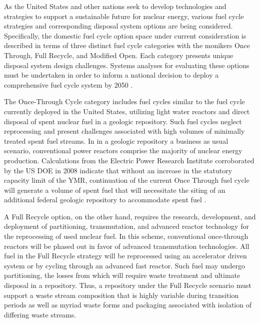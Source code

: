 

As the United States and other nations seek to develop technologies and strategies to support a 
sustainable future for nuclear energy, various fuel cycle strategies and 
corresponding disposal system options are being considered.  Specifically, the 
domestic fuel cycle option space under current consideration is described in 
terms of three distinct fuel cycle categories with the monikers Once Through, 
Full Recycle, and Modified Open. Each category presents unique disposal system 
design challenges. Systems analyses for evaluating these options must 
be undertaken in order to inform a national decision to deploy a comprehensive 
fuel cycle system by 2050 \cite{doe_nuclear_2010}. 


The Once-Through Cycle category includes fuel cycles similar to the fuel cycle 
currently deployed in the United States, utilizing light water reactors and 
direct disposal of spent nuclear fuel in a geologic repository.
Such fuel cycles neglect reprocessing and present challenges associated with 
high volumes of minimally treated spent fuel streams.  In in a geologic 
repository a business as usual 
scenario, conventional power reactors comprise the majority of nuclear energy 
production. 
Calculations from the Electric Power Research Institute corroborated by 
the \gls{US} \gls{DOE} in 2008 indicate that without an increase in the statutory 
capacity limit of the \gls{YMR}, continuation of the current Once Through fuel 
cycle will generate a volume of spent fuel that will necessitate
the siting of an additional federal geologic repository to accommodate spent 
fuel \cite{kessler_room_2006, doe_report_2008}. 


A Full Recycle option, on the other hand, requires the research, development, 
and deployment of partitioning, transmutation, and advanced reactor technology 
for the reprocessing of used nuclear fuel.  In this scheme, conventional 
once-through reactors will be phased out in favor of advanced transmutation 
technologies. All fuel in the Full Recycle strategy will be 
reprocessed using an accelerator driven system or by 
cycling through an advanced fast reactor. Such fuel may undergo partitioning, 
the losses from which will require waste treatment and ultimate disposal in a 
repository. Thus, a repository under the Full Recycle scenario must support
a waste stream composition that is highly variable during transition periods as 
well as myriad waste forms and packaging associated with isolation of differing 
waste streams.

